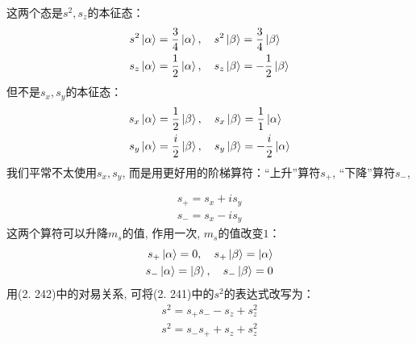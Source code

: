 这两个态是$s^2,s_z$的本征态：
\begin{subequations}
	\begin{align}
	s^2\Ket{\alpha} & = \frac{3}{4}\Ket{\alpha},\quad s^2\Ket{\beta} = \frac{3}{4}\Ket{\beta}\\
	s_z\Ket{\alpha} & =\frac{1}{2}\Ket{\alpha},\quad s_z\Ket{\beta} = -\frac{1}{2}\Ket{\beta}
	\end{align}
\end{subequations}
但不是$s_x,s_y$的本征态：
\begin{subequations}
	\begin{align}
	s_x\Ket{\alpha} & = \frac{1}{2}\Ket{\beta},\quad s_x\Ket{\beta} = \frac{1}{1}\Ket{\alpha}\\
	s_y\Ket{\alpha} & =\frac{i}{2}\Ket{\beta},\quad s_y\Ket{\beta} = -\frac{i}{2}\Ket{\alpha}
	\end{align}
\end{subequations}
我们平常不太使用$s_x,s_y$, 
而是用更好用的阶梯算符：``上升”算符$s_+$, 
``下降”算符$s_-$,

\begin{subequations}
	\begin{align}
	s_+ = s_x + is_y\\
	s_- = s_x - is_y
	\end{align}
\end{subequations}
这两个算符可以升降$m_s$的值, 
作用一次, 
$m_s$的值改变$1$：
\begin{subequations}
	\begin{align}
	s_+\Ket{\alpha} = 0,\quad s_+\Ket{\beta} = \Ket{\alpha}\\
	s_-\Ket{\alpha} = \Ket{\beta},\quad s_-\Ket{\beta} = 0\\
	\end{align}
\end{subequations}
用(2.
242)中的对易关系, 
可将(2.
241)中的$s^2$的表达式改写为：
\begin{subequations}
	\begin{align}
	s^2 = s_+s_- - s_z + s_z^2\\
	s^2 = s_-s_+ + s_z + s_z^2 
	\end{align}
\end{subequations}

